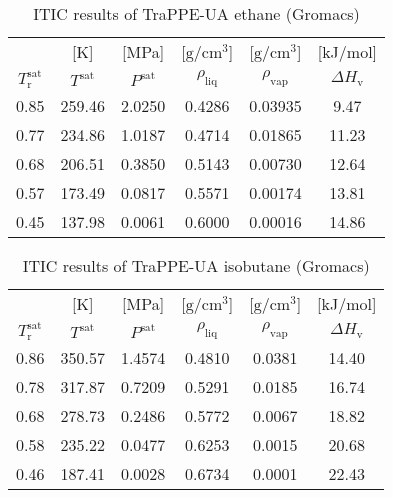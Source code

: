 \documentclass[%
 aip,
 jcp,
 sd,%
 amsmath,amssymb,
]{revtex4-1}
\begin{document}
\begin{table*}[!htbp]
\centering
\caption{
ITIC results of TraPPE-UA ethane (Gromacs)
}
\label{tab:TraPPE-C2-trappe-gmx}
\begin{ruledtabular}
\begin{tabular}{cccccc}
 & {[}K{]} &	 {[}MPa{]} & {[}$\mathrm{g/cm^3}${]} & {[}$\mathrm{g/cm^3}${]}	& {[}kJ/mol{]}  \\
$T_\mathrm{r}^{\mathrm{sat}}$ & $T^{\mathrm{sat}}$ & $P^{\mathrm{sat}}$ & $\rho_{\mathrm{liq}}$ & $\rho_{\mathrm{vap}}$ & $\Delta H_{\mathrm{v}}$ \\
\hline													
0.85	&	259.46	&	2.0250	&	0.4286	&	0.03935	&	9.47	\\
0.77	&	234.86	&	1.0187	&	0.4714	&	0.01865	&	11.23	\\
0.68	&	206.51	&	0.3850	&	0.5143	&	0.00730	&	12.64	\\
0.57	&	173.49	&	0.0817	&	0.5571	&	0.00174	&	13.81	\\
0.45	&	137.98	&	0.0061	&	0.6000	&	0.00016	&	14.86	\\
\end{tabular}
\end{ruledtabular}
\end{table*}

\begin{table*}[!htbp]
\centering
\caption{
ITIC results of TraPPE-UA isobutane (Gromacs)
}
\label{tab:TraPPE-iC4-trappe-gmx}
\begin{ruledtabular}
\begin{tabular}{cccccc}
 & {[}K{]} &	 {[}MPa{]} & {[}$\mathrm{g/cm^3}${]} & {[}$\mathrm{g/cm^3}${]}	& {[}kJ/mol{]}  \\
$T_\mathrm{r}^{\mathrm{sat}}$ & $T^{\mathrm{sat}}$ & $P^{\mathrm{sat}}$ & $\rho_{\mathrm{liq}}$ & $\rho_{\mathrm{vap}}$ & $\Delta H_{\mathrm{v}}$ \\
\hline													
0.86	&	350.57	&	1.4574	&	0.4810	&	0.0381	&	14.40	\\
0.78	&	317.87	&	0.7209	&	0.5291	&	0.0185	&	16.74	\\
0.68	&	278.73	&	0.2486	&	0.5772	&	0.0067	&	18.82	\\
0.58	&	235.22	&	0.0477	&	0.6253	&	0.0015	&	20.68	\\
0.46	&	187.41	&	0.0028	&	0.6734	&	0.0001	&	22.43	\\
\end{tabular}
\end{ruledtabular}
\end{table*}
\end{document}
